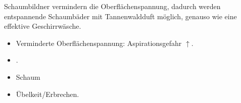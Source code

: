 {
Schaumbildner vermindern die Oberflächenspannung, dadurch
werden entspannende Schaumbäder mit Tannenwaldduft möglich,
genauso wie eine effektive Geschirrwäsche. }{

}{}{}{}

{
\begin{itemize}
    \item Verminderte Oberflächenspannung: 
    Aspirationsgefahr ${\uparrow}$.
    \item {}.
\end{itemize}
}{

}{}{}{}

{
\begin{itemize}
    \item Schaum
    \item Übelkeit/Erbrechen.
\end{itemize}
}{

}{}{}{}












% 
% 
% 
% 
% 
% 
